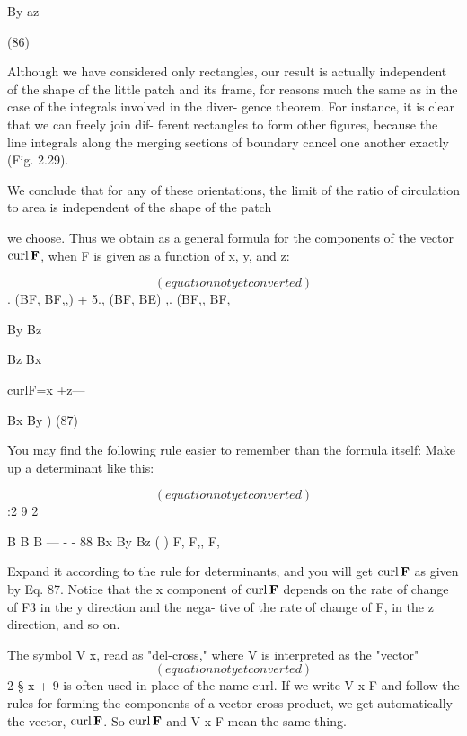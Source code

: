 {By az

(86)

Although we have considered only rectangles, our result is actually
independent of the shape of the little patch and its frame, for reasons
much the same as in the case of the integrals involved in the diver-
gence theorem. For instance, it is clear that we can freely join dif-
ferent rectangles to form other figures, because the line integrals
along the merging sections of boundary cancel one another exactly
(Fig. 2.29).

We conclude that for any of these orientations, the limit of the
ratio of circulation to area is independent of the shape of the patch

 

we choose. Thus we obtain as a general formula for the components
of the vector $\operatorname{curl}\mathbf{F}$, when F is given as a function of x, y, and z:

\begin{equation}
(equation not yet converted)
\end{equation}
. (BF, BF,,) + 5., (BF, BE) ,. (BF,, BF,

By Bz

Bz Bx

curlF=x +z---

Bx By ) (87)

You may find the following rule easier to remember than the formula
itself: Make up a determinant like this:

\begin{equation}
(equation not yet converted)
\end{equation}
:2 9 2

B B B
--- - - 88
Bx By Bz ( )
F, F,, F,

Expand it according to the rule for determinants, and you will get
$\operatorname{curl}\mathbf{F}$ as given by Eq. 87. Notice that the x component of $\operatorname{curl}\mathbf{F}$
depends on the rate of change of F3 in the y direction and the nega-
tive of the rate of change of F, in the z direction, and so on.

The symbol V x, read as "del-cross," where V is interpreted as the
"vector"
\begin{equation}
(equation not yet converted)
\end{equation}
2 §-x + 9%
is often used in place of the name curl. If we write V x F and follow
the rules for forming the components of a vector cross-product, we
get automatically the vector, $\operatorname{curl}\mathbf{F}$. So $\operatorname{curl}\mathbf{F}$ and V x F mean the
same thing.

}
